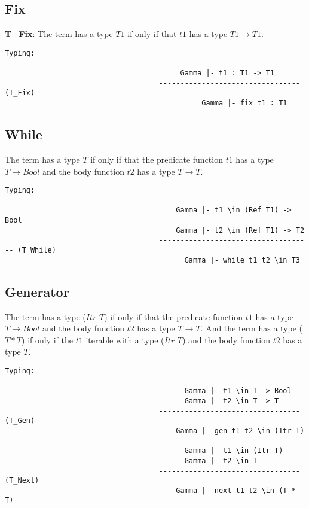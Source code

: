 \subsection{Fix}
\textbf{T_Fix}: The \fix term has a type $T1$ if only if that $t1$ has a type $T1 \rightarrow T1$.
\begin{lstlisting}
Typing:

									     Gamma |- t1 : T1 -> T1
									---------------------------------   (T_Fix)
									 		  Gamma |- fix t1 : T1
\end{lstlisting}

\subsection{While}
The \while term has a type $T$ if only if that the predicate function $t1$ has a type $T \rightarrow Bool$ and the body function $t2$ has a type $T \rightarrow T$.
\begin{lstlisting}
Typing:

									    Gamma |- t1 \in (Ref T1) -> Bool
									    Gamma |- t2 \in (Ref T1) -> T2
									------------------------------------ (T_While)
										  Gamma |- while t1 t2 \in T3
\end{lstlisting}


\subsection{Generator}
The \gen term has a type ($Itr$ $T$) if only if that the predicate function $t1$ has a type $T \rightarrow Bool$ and the body function $t2$ has a type $T \rightarrow T$. And the \nt term has a type ($T*T$) if only if the $t1$ iterable with a type ($Itr$ $T$) and the body function $t2$ has a type $T$.
\begin{lstlisting}
Typing:

										  Gamma |- t1 \in T -> Bool
										  Gamma |- t2 \in T -> T
									---------------------------------   (T_Gen)
										Gamma |- gen t1 t2 \in (Itr T)

										  Gamma |- t1 \in (Itr T)
										  Gamma |- t2 \in T
									---------------------------------   (T_Next)
										Gamma |- next t1 t2 \in (T * T)
\end{lstlisting}